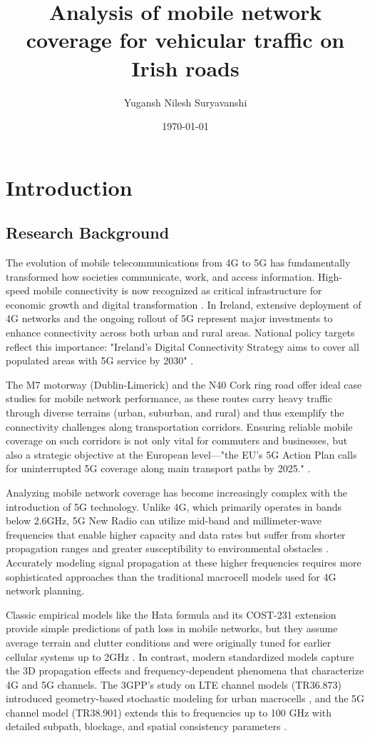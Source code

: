 \documentclass[MScCS]{uccthesis}
\title{Analysis of mobile network coverage for vehicular traffic on Irish roads}
\author{Yugansh Nilesh Suryavanshi}
\date{\today}
\begin{document}
  \chapter{Introduction}

\section{Research Background}

The evolution of mobile telecommunications from 4G to 5G has fundamentally transformed how societies communicate, work, and access information. High-speed mobile connectivity is now recognized as critical infrastructure for economic growth and digital transformation \cite{eu2016_action_plan}. In Ireland, extensive deployment of 4G networks and the ongoing rollout of 5G represent major investments to enhance connectivity across both urban and rural areas. National policy targets reflect this importance: "Ireland's Digital Connectivity Strategy aims to cover all populated areas with 5G service by 2030" \cite{decc2022_strategy}.

The M7 motorway (Dublin-Limerick) and the N40 Cork ring road offer ideal case studies for mobile network performance, as these routes carry heavy traffic through diverse terrains (urban, suburban, and rural) and thus exemplify the connectivity challenges along transportation corridors. Ensuring reliable mobile coverage on such corridors is not only vital for commuters and businesses, but also a strategic objective at the European level---"the EU's 5G Action Plan calls for uninterrupted 5G coverage along main transport paths by 2025." \cite{eu2016_action_plan}.

Analyzing mobile network coverage has become increasingly complex with the introduction of 5G technology. Unlike 4G, which primarily operates in bands below 2.6GHz, 5G New Radio can utilize mid-band and millimeter-wave frequencies that enable higher capacity and data rates but suffer from shorter propagation ranges and greater susceptibility to environmental obstacles \cite{tsoulos2024highway}. Accurately modeling signal propagation at these higher frequencies requires more sophisticated approaches than the traditional macrocell models used for 4G network planning.

Classic empirical models like the Hata formula and its COST-231 extension provide simple predictions of path loss in mobile networks, but they assume average terrain and clutter conditions and were originally tuned for earlier cellular systems up to 2GHz \cite{hata1980empirical, cost231}. In contrast, modern standardized models capture the 3D propagation effects and frequency-dependent phenomena that characterize 4G and 5G channels. The 3GPP's study on LTE channel models (TR36.873) introduced geometry-based stochastic modeling for urban macrocells \cite{3gpp_tr36873}, and the 5G channel model (TR38.901) extends this to frequencies up to 100 GHz with detailed subpath, blockage, and spatial consistency parameters \cite{3gpp2024channel}.
\end{document}
